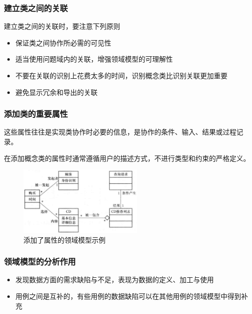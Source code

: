\subsubsection{建立类之间的关联}
建立类之间的关联时，要注意下列原则
\begin{itemize}
    \item 保证类之间协作所必需的可见性
    \item 适当使用问题域内的关联，增强领域模型的可理解性
    \item 不要在关联的识别上花费太多的时间，识别概念类比识别关联更加重要
    \item 避免显示冗余和导出的关联
\end{itemize}


\subsubsection{添加类的重要属性}
这些属性往往是实现类协作时必要的信息，是协作的条件、输入、结果或过程记录。

在添加概念类的属性时通常遵循用户的描述方式，不进行类型和约束的严格定义。

\begin{figure}[H]
	\centering
    \vspace{-0.5em}
	\includegraphics[width=0.55\textwidth]{img/添加了属性的领域模型示例.png}
    \caption*{添加了属性的领域模型示例}
    \vspace{-1em}
\end{figure}


\subsubsection{领域模型的分析作用}
\begin{itemize}
    \item 发现数据方面的需求缺陷与不足，表现为数据的定义、加工与使用
    \item 用例之间是互补的，有些用例的数据缺陷可以在其他用例的领域模型中得到补充
\end{itemize}

